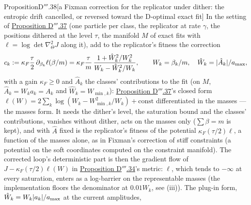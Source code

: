 \begin{thm}{Proposition}{D$'''$.38}[a Fixman correction for the replicator under dither: the entropic drift cancelled,
or reversed toward the D-optimal exact fit]\label{res:thmDppp:38}%
In the setting of \hyperref[res:thmDppp:37]{Proposition D$'''$.37} (one particle per class, the replicator at rate
$\gamma$, the positions dithered at the level $\tau$, the manifold $M$ of exact fits with
$\ell = \log\det\nabla^2_\Theta J$ along it), add to the replicator's fitness the correction
\[
  c_k := \kappa_F\frac\tau2\,\partial_{\beta_k}\ell(\beta/m)
  = \kappa_F\frac\tau m\,\frac{1 + \hat W_k^2/W_k^2}{W_k - \hat W_k^2/W_k},\qquad
  W_k = \beta_k/m,\quad \hat W_k = \lvert \hat A_k\rvert/a_{\max},
\]
with a gain $\kappa_F\ge0$ and $\hat A_k$ the classes' contributions to the fit (on $M$, $\hat A_k = W_ka_k = A_k$ and
$\hat W_k = W_{\min,k}$): \hyperref[res:thmDppp:37]{Proposition D$'''$.37}'s closed form
$\ell(W) = 2\sum_k\log(W_k - W_{\min,k}^2/W_k) + \text{const}$ differentiated in the masses --- the masses form. It
needs the dither's level, the saturation bound and the classes' contributions, vanishes without dither, acts on the
masses only ($\sum\beta = m$ is kept), and with $\hat A$ fixed is the replicator's fitness of the potential
$\kappa_F(\tau/2)\ell$, a function of the masses alone, as in Fixman's correction of stiff constraints (a potential on
the soft coordinates computed on the constraint manifold). The corrected loop's deterministic part is then the gradient
flow of $J - \kappa_F(\tau/2)\ell(W)$ in \hyperref[res:thmDppp:34]{Proposition D$'''$.34}'s metric: $\ell$, which tends
to $-\infty$ at every saturation, enters as a log-barrier on the representable masses (the implementation floors the
denominator at $0.01W_k$, see (iii)). The plug-in form, $\hat W_k = W_k\lvert a_k\rvert/a_{\max}$ at the current amplitudes,

\end{thm}
